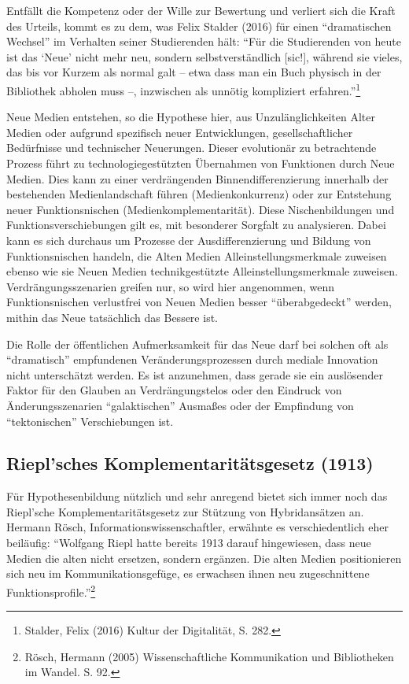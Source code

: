 \documentclass[a4paper,
fontsize=11pt,
oneside,
numbers=noperiodatend,
parskip=half-,
bibliography=totoc,
final
]{scrartcl}
\begin{document}
Entfällt die Kompetenz oder der Wille zur Bewertung und verliert sich
die Kraft des Urteils, kommt es zu dem, was Felix Stalder (2016) für
einen \enquote{dramatischen Wechsel} im Verhalten seiner Studierenden
hält: \enquote{Für die Studierenden von heute ist das \enquote{Neue}
nicht mehr neu, sondern selbstverständlich {[}sic!{]}, während sie
vieles, das bis vor Kurzem als normal galt -- etwa dass man ein Buch
physisch in der Bibliothek abholen muss --, inzwischen als unnötig
kompliziert erfahren.}\footnote{Stalder, Felix (2016) Kultur der
  Digitalität, S. 282.}

Neue Medien entstehen, so die Hypothese hier, aus Unzulänglichkeiten
Alter Medien oder aufgrund spezifisch neuer Entwicklungen,
gesellschaftlicher Bedürfnisse und technischer Neuerungen. Dieser
evolutionär zu betrachtende Prozess führt zu technologiegestützten
Übernahmen von Funktionen durch Neue Medien. Dies kann zu einer
verdrängenden Binnendifferenzierung innerhalb der bestehenden
Medienlandschaft führen (Medienkonkurrenz) oder zur Entstehung neuer
Funktionsnischen (Medienkomplementarität). Diese Nischenbildungen und
Funktionsverschiebungen gilt es, mit besonderer Sorgfalt zu analysieren.
Dabei kann es sich durchaus um Prozesse der Ausdifferenzierung und
Bildung von Funktionsnischen handeln, die Alten Medien
Alleinstellungsmerkmale zuweisen ebenso wie sie Neuen Medien
technikgestützte Alleinstellungsmerkmale zuweisen. Verdrängungsszenarien
greifen nur, so wird hier angenommen, wenn Funktionsnischen verlustfrei
von Neuen Medien besser \enquote{überabgedeckt} werden, mithin das Neue
tatsächlich das Bessere ist.

Die Rolle der öffentlichen Aufmerksamkeit für das Neue darf bei solchen
oft als \enquote{dramatisch} empfundenen Veränderungsprozessen durch
mediale Innovation nicht unterschätzt werden. Es ist anzunehmen, dass
gerade sie ein auslösender Faktor für den Glauben an Verdrängungstelos
oder den Eindruck von Änderungsszenarien \enquote{galaktischen} Ausmaßes
oder der Empfindung von \enquote{tektonischen} Verschiebungen ist.

\subsection*{Riepl'sches Komplementaritätsgesetz
(1913)}\label{rieplsches-komplementarituxe4tsgesetz-1913}

Für Hypothesenbildung nützlich und sehr anregend bietet sich immer noch
das Riepl'sche Komplementaritätsgesetz zur Stützung von Hybridansätzen
an. Hermann Rösch, Informationswissenschaftler, erwähnte es
verschiedentlich eher beiläufig: \enquote{Wolfgang Riepl hatte bereits
1913 darauf hingewiesen, dass neue Medien die alten nicht ersetzen,
sondern ergänzen. Die alten Medien positionieren sich neu im
Kommunikationsgefüge, es erwachsen ihnen neu zugeschnittene
Funktionsprofile.}\footnote{Rösch, Hermann (2005) Wissenschaftliche
  Kommunikation und Bibliotheken im Wandel. S. 92.}
\end{document}

